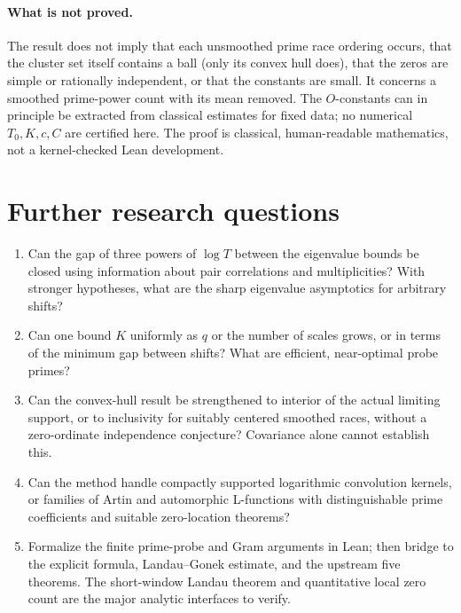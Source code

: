 \documentclass[11pt]{article}
\theoremstyle{remark}\newtheorem{remark}[theorem]{Remark}
\begin{document}
\paragraph{What is not proved.} The result does not imply that each unsmoothed prime race ordering occurs, that the cluster set itself contains a ball (only its convex hull does), that the zeros are simple or rationally independent, or that the constants are small. It concerns a smoothed prime-power count with its mean removed. The $O$-constants can in principle be extracted from classical estimates for fixed data; no numerical $T_0,K,c,C$ are certified here. The proof is classical, human-readable mathematics, not a kernel-checked Lean development.

\section{Further research questions}
\begin{enumerate}
\item Can the gap of three powers of $\log T$ between the eigenvalue bounds be closed using information about pair correlations and multiplicities? With stronger hypotheses, what are the sharp eigenvalue asymptotics for arbitrary shifts?
\item Can one bound $K$ uniformly as $q$ or the number of scales grows, or in terms of the minimum gap between shifts? What are efficient, near-optimal probe primes?
\item Can the convex-hull result be strengthened to interior of the actual limiting support, or to inclusivity for suitably centered smoothed races, without a zero-ordinate independence conjecture? Covariance alone cannot establish this.
\item Can the method handle compactly supported logarithmic convolution kernels, or families of Artin and automorphic L-functions with distinguishable prime coefficients and suitable zero-location theorems?
\item Formalize the finite prime-probe and Gram arguments in Lean; then bridge to the explicit formula, Landau--Gonek estimate, and the upstream five theorems. The short-window Landau theorem and quantitative local zero count are the major analytic interfaces to verify.
\end{enumerate}
\end{document}
